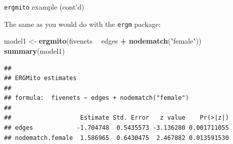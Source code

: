 \documentclass[10pt,ignorenonframetext,aspectratio=169,]{beamer}
\newenvironment{Shaded}{\begin{snugshade}}{\end{snugshade}}
\newcommand{\KeywordTok}[1]{\textcolor[rgb]{0.13,0.29,0.53}{\textbf{#1}}}
\newcommand{\NormalTok}[1]{#1}
\newcommand{\OperatorTok}[1]{\textcolor[rgb]{0.81,0.36,0.00}{\textbf{#1}}}
\newcommand{\StringTok}[1]{\textcolor[rgb]{0.31,0.60,0.02}{#1}}
\begin{document}
\begin{frame}[fragile]{\texttt{ergmito} example (cont'd)}
\protect\hypertarget{ergmito-example-contd}{}

The same as you would do with the \texttt{ergm} package:\linebreak[4]

\footnotesize

\begin{Shaded}
\begin{Highlighting}[]
\NormalTok{model1 <-}\StringTok{ }\KeywordTok{ergmito}\NormalTok{(fivenets }\OperatorTok{~}\StringTok{ }\NormalTok{edges }\OperatorTok{+}\StringTok{ }\KeywordTok{nodematch}\NormalTok{(}\StringTok{"female"}\NormalTok{))}
\KeywordTok{summary}\NormalTok{(model1)}
\end{Highlighting}
\end{Shaded}

\begin{verbatim}
## 
## ERGMito estimates
## 
## formula:  fivenets ~ edges + nodematch("female") 
## 
##                   Estimate Std. Error   z value    Pr(>|z|)
## edges            -1.704748  0.5435573 -3.136280 0.001711055
## nodematch.female  1.586965  0.6430475  2.467882 0.013591530
\end{verbatim}

\normalsize

\end{frame}
\end{document}
